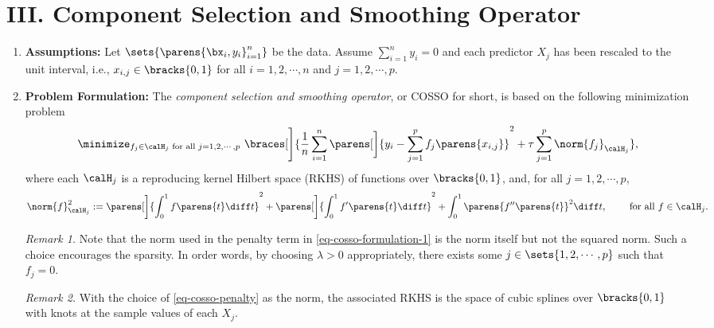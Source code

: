 \documentclass[12pt]{article}
\begin{document}
\section*{III. Component Selection and Smoothing Operator}

\begin{enumerate}[label=\textbf{\arabic*.}]
	
	\item \textbf{Assumptions:} Let $\sets{\parens{\bx_i, y_i}_{i=1}^n}$ be the data. Assume $\sum_{i=1}^n y_i = 0$ and each predictor $X_j$ has been rescaled to the unit interval, i.e., $x_{i,j} \in \bracks{0, 1}$ for all $i = 1, 2, \cdots, n$ and $j = 1, 2, \cdots, p$. 
	
	\item \textbf{Problem Formulation:}  The \emph{component selection and smoothing operator}, or COSSO for short, is based on the following minimization problem 
	\begin{align}\label{eq-cosso-formulation-1}
		\minimize_{f_j \in \calH_j \text{ for all } j = 1, 2, \cdots, p} \ \braces[\Bigg]{\frac{1}{n} \sum_{i=1}^n \parens[\bigg]{y_i - \sum_{j=1}^p f_j \parens{x_{i,j}}}^2 + \tau \sum_{j=1}^p \norm{f_j}_{\calH_j}}, 
	\end{align}
	where each $\calH_j$ is a reproducing kernel Hilbert space (RKHS) of functions over $\bracks{0, 1}$, and, for all $j = 1, 2, \cdots, p$, 
	\begin{align}\label{eq-cosso-penalty}
		\norm{f}_{\calH_j}^2 := \parens[\bigg]{\int_0^1 f \parens{t} \diff t}^2 + \parens[\bigg]{\int_0^1 f' \parens{t} \diff t}^2 + \int_0^1 \parens{f'' \parens{t}}^2 \diff t, \qquad \text{ for all } f \in \calH_j. 
	\end{align}
	
	\textit{Remark 1.} Note that the norm used in the penalty term in \eqref{eq-cosso-formulation-1} is the norm itself but not the squared norm. Such a choice encourages the sparsity. In order words, by choosing $\lambda > 0$ appropriately, there exists some $j \in \sets{1, 2, \cdots, p}$ such that $f_j = 0$. 
	
	\textit{Remark 2.} With the choice of \eqref{eq-cosso-penalty} as the norm, the associated RKHS is the space of cubic splines over $\bracks{0, 1}$ with knots at the sample values of each $X_j$. 
	

\end{enumerate}
\end{document}
